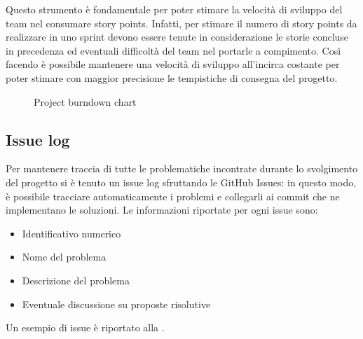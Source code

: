 Questo strumento è fondamentale per poter stimare la velocità di sviluppo del team nel consumare story points. Infatti, per stimare il numero di story points da realizzare in uno sprint devono essere tenute in considerazione le storie concluse in precedenza ed eventuali difficoltà del team nel portarle a compimento.
Così facendo è possibile mantenere una velocità di sviluppo all'incirca costante per poter stimare con maggior precisione le tempistiche di consegna del progetto.

\begin{figure}[htp]
  \centering
  \caption{Project burndown chart}
  \label{fig:project-burndown-chart}
\end{figure}

\subsection{Issue log}
Per mantenere traccia di tutte le problematiche incontrate durante lo svolgimento del progetto si è tenuto un issue log sfruttando le GitHub Issues: in questo modo, è possibile tracciare automaticamente i problemi e collegarli ai commit che ne implementano le soluzioni.
Le informazioni riportate per ogni issue sono:
\begin{itemize}
  \item Identificativo numerico
  \item Nome del problema
  \item Descrizione del problema
  \item Eventuale discussione su proposte risolutive
\end{itemize}

Un esempio di issue è riportato alla .

